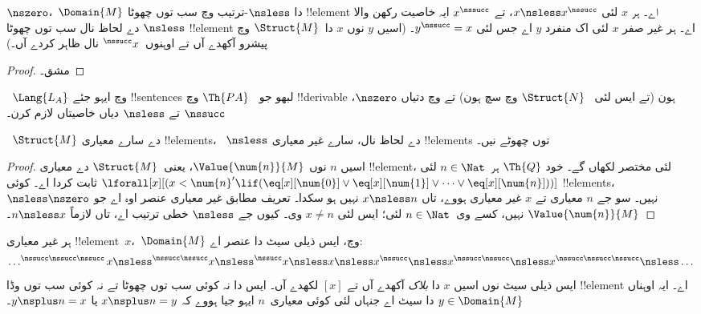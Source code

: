 \documentclass[../../../include/open-logic-section]{subfiles}
\begin{document}
\begin{prop}
 $\nszero$،~$\Domain{M}$ دا
$\nsless$-ترتیب وچ سب توں چھوٹا !!{element} اے۔
ہر $x$ لئی $x \nsless x^\nssucc$، تے
$x^\nssucc$ ایہ خاصیت رکھن والا $\nsless$ دے لحاظ نال
سب توں چھوٹا !!{element} اے۔ ہر غیر صفر $x$ لئی اک منفرد
$y$ اے جس لئی $y^\nssucc = x$۔
(اسیں $y$ نوں $x$ دا~$\Struct{M}$ وچ پیشرو آکھدے آں
تے اوہنوں~$^\nssucc x$ نال ظاہر کردے آں۔)
\end{prop}

\begin{proof}
مشق۔
\end{proof}

\begin{prob}
~$\Lang{L_A}$ وچ ایہو جئے !!{sentence}s لبھو جو
~$\Th{PA}$ وچ !!{derivable} ہون (تے ایس لئی
~$\Struct{N}$ وچ سچ ہون) تے
 وچ دتیاں
$\nszero$، $\nssucc$ تے $\nsless$ دیاں خاصیتاں
لازم کرن۔
\end{prob}

\begin{prop}
~$\Struct{M}$ دے سارے معیاری !!{element}s،
~$\nsless$ دے لحاظ نال، سارے غیر معیاری !!{element}s
توں چھوٹے نیں۔
\end{prop}

\begin{proof}
اسیں $n$ نوں $\Value{\num{n}}{M}$، یعنی~$\Struct{M}$
دے معیاری !!{element}، لئی مختصر لکھاں گے۔
خود $\Th{Q}$ ہر~$n \in \Nat$ لئی
$\lforall[x][(x < \num{n}' \lif (\eq[x][\num{0}] \lor
  \eq[x][\num{1}] \lor \dots \lor \eq[x][\num{n}]))]$
ثابت کردا اے۔ کوئی !!{element}s، $\nsless \nszero$
نہیں۔ سو جے $n$ معیاری تے $x$ غیر معیاری ہووے،
تاں $x \nsless n$ نہیں ہو سکدا۔ تعریف مطابق غیر
معیاری عنصر اوہ اے جو $\Value{\num{n}}{M}$ نہیں،
کسے وی~$n \in \Nat$ لئی؛ ایس لئی $x \neq n$ وی۔
کیوں جے $\nsless$ خطی ترتیب اے، تاں لازماً
$n \nsless x$۔
\end{proof}

\begin{prop}
ہر غیر معیاری !!{element}~$x$،~$\Domain{M}$ وچ، ایس ذیلی سیٹ
دا عنصر اے:
\[
\dots ^{\nssucc\nssucc\nssucc}x \nsless ^{\nssucc\nssucc}x \nsless
^{\nssucc}x \nsless x \nsless x^{\nssucc} \nsless x^{\nssucc\nssucc}
\nsless x^{\nssucc\nssucc\nssucc} \nsless \dots
\]
ایس ذیلی سیٹ نوں اسیں $x$ دا \emph{بلاک} آکھدے آں تے
$[x]$ لکھدے آں۔ ایس دا نہ کوئی سب توں چھوٹا تے نہ کوئی
سب توں وڈا !!{element} اے۔ ایہ اوہناں
$y \in \Domain{M}$ دا سیٹ اے جنہاں لئی کوئی معیاری~$n$
ایہو جیا ہووے کہ $x \nsplus n = y$ یا
$y \nsplus n = x$۔
\end{prop}
\end{document}
